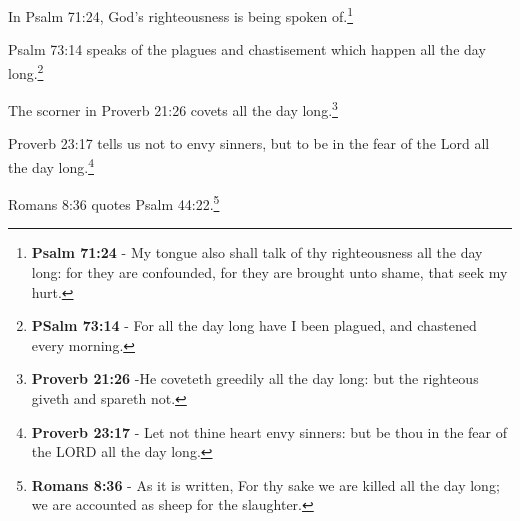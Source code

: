 \begin{compactenum}
    \item In Psalm 71:24, God's righteousness is being spoken of.\footnote{\textbf{Psalm 71:24} - My tongue also shall talk of thy righteousness all the day long: for they are confounded, for they are brought unto shame, that seek my hurt.}
    \item Psalm 73:14 speaks of the plagues and chastisement which happen all the day long.\footnote{\textbf{PSalm 73:14} - For all the day long have I been plagued, and chastened every morning.}
    \item The scorner in Proverb 21:26 covets all the day long.\footnote{\textbf{Proverb 21:26} -He coveteth greedily all the day long: but the righteous giveth and spareth not.}
    \item Proverb 23:17 tells us not to envy sinners, but to be in the fear of the Lord all the day long.\footnote{\textbf{Proverb 23:17} - Let not thine heart envy sinners: but be thou in the fear of the LORD all the day long.}
    \item Romans 8:36 quotes Psalm 44:22.\footnote{\textbf{Romans 8:36} - As it is written, For thy sake we are killed all the day long; we are accounted as sheep for the slaughter.}
\end{compactenum}